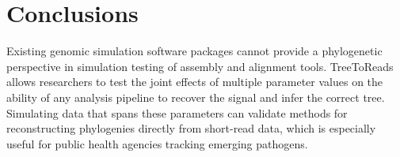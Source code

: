 \documentclass{bmcart}
\begin{document}
\section*{Conclusions}
Existing genomic simulation software packages cannot provide a phylogenetic perspective in simulation testing of assembly and alignment tools.
TreeToReads allows researchers to test the joint effects of multiple parameter values on the ability of any analysis pipeline to recover the signal and infer the correct tree.
Simulating data that spans these parameters can validate methods for reconstructing phylogenies directly from short-read data, which is especially useful for public health agencies tracking emerging pathogens. 


\end{document}
